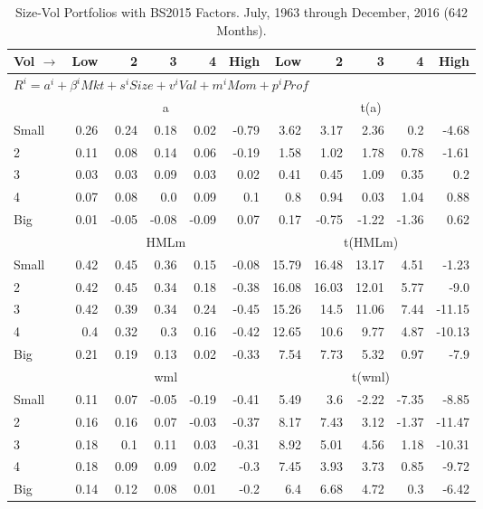 
\begin{table}[!ht]
\centering
\caption{Size-Vol Portfolios with BS2015 Factors. \footnotesize{July, 1963 through December, 2016 (642 Months).}}
\begin{tabular}{lrrrrrrrrrr}
  \toprule
  Vol $\rightarrow$ & Low & 2 & 3 & 4 & High & Low & 2 & 3 & 4 & High \\ 
  \toprule
  \multicolumn{9}{l}{$R^i=a^i+\beta^iMkt+s^iSize+v^iVal+m^iMom+p^iProf$} \\

  

      & \multicolumn{5}{c}{a} & \multicolumn{5}{c}{t(a)} \\
    \cmidrule(r){2-6} \cmidrule(r){7-11}
      Small  & 0.26  & 0.24  & 0.18  & 0.02  & -0.79   & 3.62  & 3.17  & 2.36  & 0.2  & -4.68  \\
          2  & 0.11  & 0.08  & 0.14  & 0.06  & -0.19   & 1.58  & 1.02  & 1.78  & 0.78  & -1.61  \\
          3  & 0.03  & 0.03  & 0.09  & 0.03  & 0.02   & 0.41  & 0.45  & 1.09  & 0.35  & 0.2  \\
          4  & 0.07  & 0.08  & 0.0  & 0.09  & 0.1   & 0.8  & 0.94  & 0.03  & 1.04  & 0.88  \\
      Big    & 0.01  & -0.05  & -0.08  & -0.09  & 0.07   & 0.17  & -0.75  & -1.22  & -1.36  & 0.62  \\
  

      & \multicolumn{5}{c}{HMLm} & \multicolumn{5}{c}{t(HMLm)} \\
    \cmidrule(r){2-6} \cmidrule(r){7-11}
      Small  & 0.42  & 0.45  & 0.36  & 0.15  & -0.08   & 15.79  & 16.48  & 13.17  & 4.51  & -1.23  \\
          2  & 0.42  & 0.45  & 0.34  & 0.18  & -0.38   & 16.08  & 16.03  & 12.01  & 5.77  & -9.0  \\
          3  & 0.42  & 0.39  & 0.34  & 0.24  & -0.45   & 15.26  & 14.5  & 11.06  & 7.44  & -11.15  \\
          4  & 0.4  & 0.32  & 0.3  & 0.16  & -0.42   & 12.65  & 10.6  & 9.77  & 4.87  & -10.13  \\
      Big    & 0.21  & 0.19  & 0.13  & 0.02  & -0.33   & 7.54  & 7.73  & 5.32  & 0.97  & -7.9  \\

  

      & \multicolumn{5}{c}{wml} & \multicolumn{5}{c}{t(wml)} \\
    \cmidrule(r){2-6} \cmidrule(r){7-11}
      Small  & 0.11  & 0.07  & -0.05  & -0.19  & -0.41   & 5.49  & 3.6  & -2.22  & -7.35  & -8.85  \\
          2  & 0.16  & 0.16  & 0.07  & -0.03  & -0.37   & 8.17  & 7.43  & 3.12  & -1.37  & -11.47  \\
          3  & 0.18  & 0.1  & 0.11  & 0.03  & -0.31   & 8.92  & 5.01  & 4.56  & 1.18  & -10.31  \\
          4  & 0.18  & 0.09  & 0.09  & 0.02  & -0.3   & 7.45  & 3.93  & 3.73  & 0.85  & -9.72  \\
      Big    & 0.14  & 0.12  & 0.08  & 0.01  & -0.2   & 6.4  & 6.68  & 4.72  & 0.3  & -6.42  \\


\end{tabular}
\end{table}
